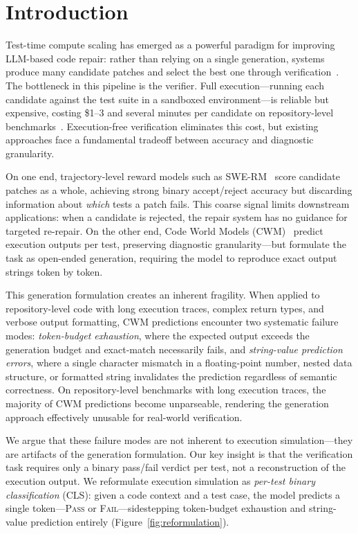 
\section{Introduction}
\label{sec:introduction}

Test-time compute scaling has emerged as a powerful paradigm for improving LLM-based code repair: rather than relying on a single generation, systems produce many candidate patches and select the best one through verification~\citep{snell2024scaling}. The bottleneck in this pipeline is the verifier. Full execution---running each candidate against the test suite in a sandboxed environment---is reliable but expensive, costing \$1--3 and several minutes per candidate on repository-level benchmarks~\citep{jimenez2024swebench}. Execution-free verification eliminates this cost, but existing approaches face a fundamental tradeoff between accuracy and diagnostic granularity.

On one end, trajectory-level reward models such as SWE-RM~\citep{shum2025swerm} score candidate patches as a whole, achieving strong binary accept/reject accuracy but discarding information about \emph{which} tests a patch fails. This coarse signal limits downstream applications: when a candidate is rejected, the repair system has no guidance for targeted re-repair. On the other end, Code World Models (CWM)~\citep{meta2025cwm,maimon2026selfexecution} predict execution outputs per test, preserving diagnostic granularity---but formulate the task as open-ended generation, requiring the model to reproduce exact output strings token by token.

This generation formulation creates an inherent fragility. When applied to repository-level code with long execution traces, complex return types, and verbose output formatting, CWM predictions encounter two systematic failure modes: \emph{token-budget exhaustion}, where the expected output exceeds the generation budget and exact-match necessarily fails, and \emph{string-value prediction errors}, where a single character mismatch in a floating-point number, nested data structure, or formatted string invalidates the prediction regardless of semantic correctness. On repository-level benchmarks with long execution traces, the majority of CWM predictions become unparseable, rendering the generation approach effectively unusable for real-world verification.

We argue that these failure modes are not inherent to execution simulation---they are artifacts of the generation formulation. Our key insight is that the verification task requires only a binary pass/fail verdict per test, not a reconstruction of the execution output. We reformulate execution simulation as \emph{per-test binary classification} (CLS): given a code context and a test case, the model predicts a single token---\textsc{Pass} or \textsc{Fail}---sidestepping token-budget exhaustion and string-value prediction entirely (Figure~\ref{fig:reformulation}).

